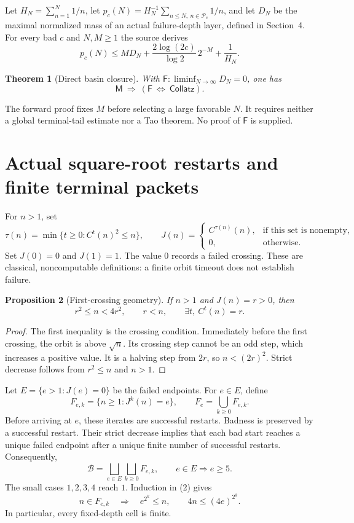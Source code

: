 \documentclass[11pt,a4paper]{article}
\newtheorem{theorem}{Theorem}[section]
\newtheorem{proposition}[theorem]{Proposition}
\theoremstyle{definition}
\newcommand{\CC}{\mathsf{Collatz}}
\newcommand{\MM}{\mathsf M}
\newcommand{\FF}{\mathsf F}
\newcommand{\Bad}{\mathcal B}
\newcommand{\Pred}{\mathcal P}
\begin{document}
Let $H_N=\sum_{n=1}^N1/n$, let
$p_c(N)=H_N^{-1}\sum_{n\le N,\ n\in\Pred_c}1/n$, and let $D_N$ be the
maximal normalized mass of an actual failure-depth layer, defined in
Section~4. For every bad $c$ and $N,M\ge1$ the source derives
\[
 \boxed{p_c(N)\le M D_N+
       \frac{2\log(2c)}{\log2}\,2^{-M}+\frac1{H_N}.}
 \tag{1}
\]
\begin{theorem}[Direct basin closure]\label{thm:main}
With $\FF:\liminf_{N\to\infty}D_N=0$, one has
\[
 \boxed{\MM\ \Longrightarrow\ (\FF\ \Longleftrightarrow\ \CC).}
\]
\end{theorem}
The forward proof fixes $M$ before selecting a large favorable $N$.
It requires neither a global terminal-tail estimate nor a Tao theorem.
No proof of $\FF$ is supplied.

\newpage
\section{Actual square-root restarts and finite terminal packets}
For $n>1$, set
\[
 \tau(n)=\min\{t\ge0:C^t(n)^2\le n\},\qquad
 J(n)=
 \begin{cases}
 C^{\tau(n)}(n),&\text{if this set is nonempty},\\
 0,&\text{otherwise}.
 \end{cases}
\]
Set $J(0)=0$ and $J(1)=1$. The value $0$ records a failed crossing.
These are classical, noncomputable definitions: a finite orbit timeout
does not establish failure.

\begin{proposition}[First-crossing geometry]\label{prop:cross}
If $n>1$ and $J(n)=r>0$, then
\[
 r^2\le n<4r^2,\qquad r<n,\qquad \exists t,\ C^t(n)=r.
 \tag{2}
\]
\end{proposition}
\begin{proof}
The first inequality is the crossing condition. Immediately before the first
crossing, the orbit is above $\sqrt n$. Its crossing step cannot be an odd
step, which increases a positive value. It is a halving step from $2r$,
so $n<(2r)^2$. Strict decrease follows from $r^2\le n$ and $n>1$.
\end{proof}

Let $E=\{e>1:J(e)=0\}$ be the failed endpoints. For $e\in E$, define
\[
 F_{e,k}=\{n\ge1:J^k(n)=e\},\qquad F_e=\bigcup_{k\ge0}F_{e,k}.
\]
Before arriving at $e$, these iterates are successful restarts. Badness is
preserved by a successful restart. Their strict decrease implies that each
bad start reaches a unique failed endpoint after a unique finite number of
successful restarts. Consequently,
\[
 \Bad=\bigsqcup_{e\in E}\bigsqcup_{k\ge0} F_{e,k},\qquad e\in E\Rightarrow e\ge5.
 \tag{3}
\]
The small cases $1,2,3,4$ reach $1$. Induction in (2) gives
\[
 n\in F_{e,k}\quad\Longrightarrow\quad
 e^{2^k}\le n,\qquad 4n\le(4e)^{2^k}.
 \tag{4}
\]
In particular, every fixed-depth cell is finite.
\end{document}
